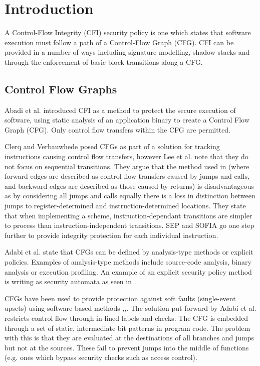\section{Introduction}
A Control-Flow Integrity (CFI) security policy is one which states that software execution must follow a path of a Control-Flow Graph (CFG). CFI can be provided in a number of ways including signature modelling, shadow stacks and through the enforcement of basic block transitions along a CFG.

\subsection{Control Flow Graphs}
Abadi et al. \cite{Abadi2005} introduced CFI as a method to protect the secure execution of software, using static analysis of an application binary to create a Control Flow Graph (CFG). Only control flow transfers within the CFG are permitted.

Clerq and Verbauwhede \cite{DeClercq2017} posed CFGs as part of a solution for tracking instructions causing control flow transfers, however Lee et al. \cite{Lee2019} note that they do not focus on sequential transitions. They argue that the method used in \cite{DeClercq2017} (where forward edges are described as control flow transfers caused by jumps and calls, and backward edges are described as those caused by returns) is disadvantageous as by considering all jumps and calls equally there is a loss in distinction between jumps to register-determined and instruction-determined locations. They state that when implementing a scheme, instruction-dependant transitions are simpler to process than instruction-independent transitions. SEP \cite{Lee2019} and SOFIA \cite{DeClercq2017b} go one step further to provide integrity protection for each individual instruction.

Adabi et al. \cite{Abadi2005} state that CFGs can be defined by analysis-type methods or explicit policies. Examples of analysis-type methods include source-code analysis, binary analysis or execution profiling. An example of an explicit security policy method is writing as security automata as seen in \cite{Erlingsson2004}. 
\ifnotesincluded
{}
\fi

CFGs have been used to provide protection against soft faults (single-event upsets) using software based methods \cite{Oh2002},\cite{Sharma2012},\cite{Venkatasubramanian2003}. 
The solution put forward by Adabi et al. \cite{Abadi2005} restricts control flow through in-lined labels and checks. The CFG is embedded through a set of static, intermediate bit patterns in program code. The problem with this is that they are evaluated at the destinations of all branches and jumps but not at the sources. These fail to prevent jumps into the middle of functions (e.g. ones which bypass security checks such as access control).

